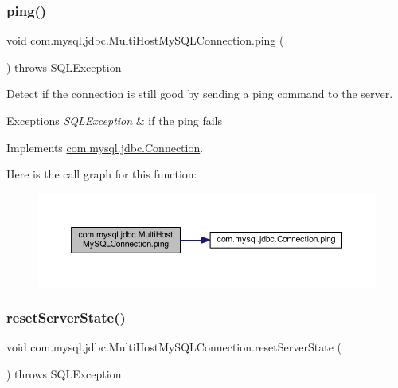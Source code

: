\subsubsection{\texorpdfstring{ping()}{ping()}}
{\footnotesize\ttfamily void com.\+mysql.\+jdbc.\+Multi\+Host\+My\+S\+Q\+L\+Connection.\+ping (\begin{DoxyParamCaption}{ }\end{DoxyParamCaption}) throws S\+Q\+L\+Exception}

Detect if the connection is still good by sending a ping command to the server.


\begin{DoxyExceptions}{Exceptions}
{\em S\+Q\+L\+Exception} & if the ping fails \\
\hline
\end{DoxyExceptions}


Implements \mbox{\hyperlink{interfacecom_1_1mysql_1_1jdbc_1_1_connection_a65a9bf75714ed318b0324f99dfa09761}{com.\+mysql.\+jdbc.\+Connection}}.

Here is the call graph for this function\+:
\nopagebreak
\begin{figure}[H]
\begin{center}
\leavevmode
\includegraphics[width=350pt]{classcom_1_1mysql_1_1jdbc_1_1_multi_host_my_s_q_l_connection_a636155352e7bad08773dd608f858676c_cgraph}
\end{center}
\end{figure}
\mbox{\label{classcom_1_1mysql_1_1jdbc_1_1_multi_host_my_s_q_l_connection_a5099a4923c0bc5e2bfb8236dfe88453c}} 
\subsubsection{\texorpdfstring{reset\+Server\+State()}{resetServerState()}}
{\footnotesize\ttfamily void com.\+mysql.\+jdbc.\+Multi\+Host\+My\+S\+Q\+L\+Connection.\+reset\+Server\+State (\begin{DoxyParamCaption}{ }\end{DoxyParamCaption}) throws S\+Q\+L\+Exception}

